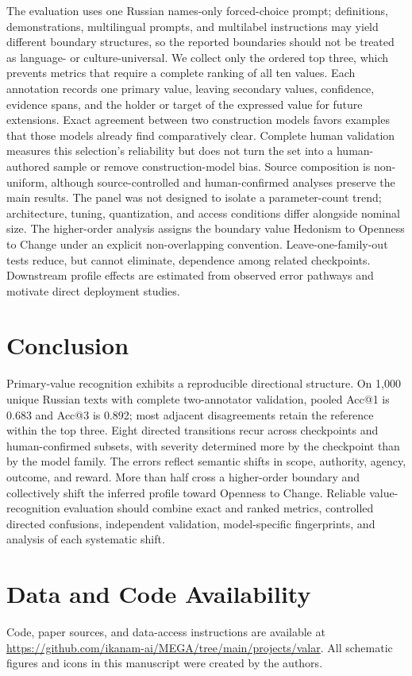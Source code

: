 \documentclass[runningheads,a4paper]{llncs}
\begin{document}
The evaluation uses one Russian names-only forced-choice prompt; definitions,
demonstrations, multilingual prompts, and multilabel instructions may yield
different boundary structures, so the reported boundaries should not be
treated as language- or culture-universal. We collect only the ordered top
three, which prevents metrics that require a complete ranking of all ten
values. Each annotation records one primary value, leaving secondary values,
confidence, evidence spans, and the holder or target of the expressed value
for future extensions. Exact agreement between two construction models favors
examples that those models already find comparatively clear. Complete human
validation measures this selection's reliability but does not turn the set
into a human-authored sample or remove construction-model bias. Source
composition is non-uniform, although source-controlled and human-confirmed
analyses preserve the main results. The panel was not designed to isolate a
parameter-count trend; architecture, tuning, quantization, and access
conditions differ alongside nominal size. The higher-order analysis assigns
the boundary value Hedonism to Openness to Change under an explicit
non-overlapping convention. Leave-one-family-out tests reduce, but cannot
eliminate, dependence among related checkpoints. Downstream profile effects
are estimated from observed error pathways and motivate direct deployment
studies.

\section{Conclusion}

Primary-value recognition exhibits a reproducible directional structure. On 1,000 unique Russian texts with complete two-annotator validation, pooled Acc@1 is 0.683 and Acc@3 is 0.892; most adjacent disagreements retain the reference within the top three. Eight directed transitions recur across checkpoints and human-confirmed subsets, with severity determined more by the checkpoint than by the model family. The errors reflect semantic shifts in scope, authority, agency, outcome, and reward. More than half cross a higher-order boundary and collectively shift the inferred profile toward Openness to Change. Reliable value-recognition evaluation should combine exact and ranked metrics, controlled directed confusions, independent validation, model-specific fingerprints, and analysis of each systematic shift.

\section*{Data and Code Availability}
Code, paper sources, and data-access instructions are available at
\url{https://github.com/ikanam-ai/MEGA/tree/main/projects/valar}.
All schematic figures and icons
in this manuscript were created by the authors.
\end{document}
